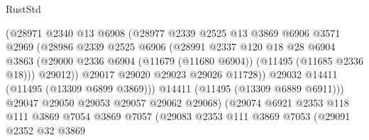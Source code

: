 \begin{lexlean}{RustStd}
\begin{coremodule}
                                (@28971
                                  @2340
                                  @13
                                  @6908
                                  (@28977
                                    @2339
                                    @2525
                                    @13
                                    @3869
                                    @6906
                                    @3571
                                    @2969
                                    (@28986
                                      @2339
                                      @2525
                                      @6906
                                      (@28991
                                        @2337
                                        @120
                                        @18
                                        @28
                                        @6904
                                        @3863
                                        (@29000
                                          @2336
                                          @6904
                                          (@11679 (@11680 @6904))
                                          (@11495 (@11685 @2336 @18)))
                                        @29012))
                                    @29017
                                    @29020
                                    @29023
                                    @29026
                                    @11728))
                                @29032
                                @14411
                                (@11495 (@13309 @6899 @3869)))
                              @14411
                              (@11495 (@13309 @6889 @6911)))
                            @29047
                            @29050
                            @29053
                            @29057
                            @29062
                            @29068)
                          (@29074
                            @6921
                            @2353
                            @118
                            @111
                            @3869
                            @7054
                            @3869
                            @7057
                            (@29083
                              @2353
                              @111
                              @3869
                              @7053
                              (@29091
                                @2352
                                @32
                                @3869

\end{coremodule}
\end{lexlean}
